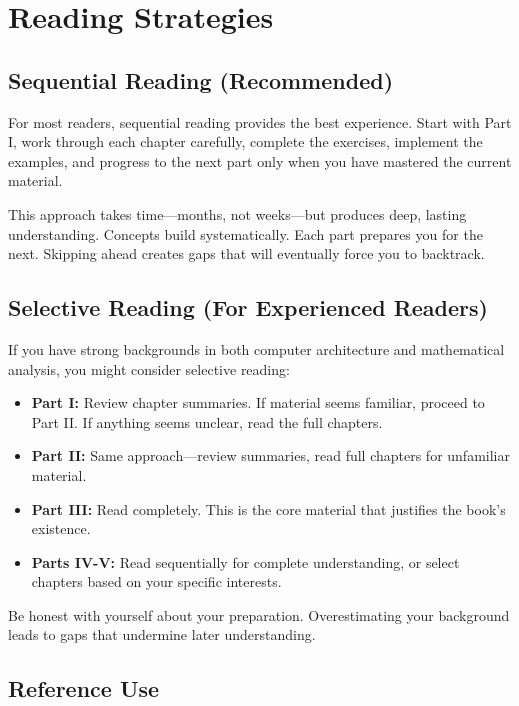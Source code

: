 \section*{Reading Strategies}

\subsection*{Sequential Reading (Recommended)}

For most readers, sequential reading provides the best experience. Start with Part I, work through each chapter carefully, complete the exercises, implement the examples, and progress to the next part only when you have mastered the current material.

This approach takes time—months, not weeks—but produces deep, lasting understanding. Concepts build systematically. Each part prepares you for the next. Skipping ahead creates gaps that will eventually force you to backtrack.

\subsection*{Selective Reading (For Experienced Readers)}

If you have strong backgrounds in both computer architecture and mathematical analysis, you might consider selective reading:

\begin{itemize}
    \item \textbf{Part I:} Review chapter summaries. If material seems familiar, proceed to Part II. If anything seems unclear, read the full chapters.
    
    \item \textbf{Part II:} Same approach—review summaries, read full chapters for unfamiliar material.
    
    \item \textbf{Part III:} Read completely. This is the core material that justifies the book's existence.
    
    \item \textbf{Parts IV-V:} Read sequentially for complete understanding, or select chapters based on your specific interests.
\end{itemize}

Be honest with yourself about your preparation. Overestimating your background leads to gaps that undermine later understanding.

\subsection*{Reference Use}

